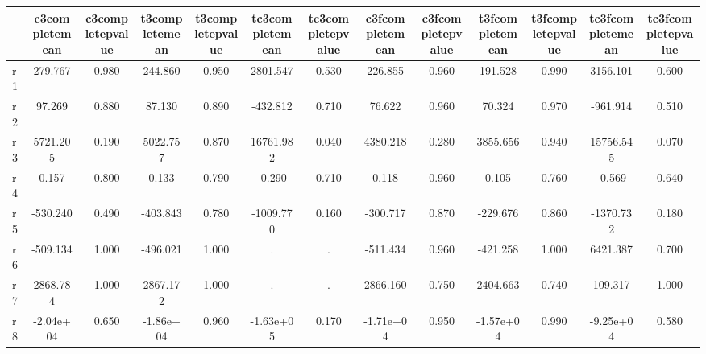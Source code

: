 \begin{table}[htbp]
\begin{tabular}{lcccccccccccc} \hline \hline
 & c3completemean  & c3completepvalue  & t3completemean  & t3completepvalue  & tc3completemean  & tc3completepvalue  & c3fcompletemean  & c3fcompletepvalue  & t3fcompletemean  & t3fcompletepvalue  & tc3fcompletemean  & tc3fcompletepvalue  \\  \hline 
r1 &   279.767 &     0.980 &   244.860 &     0.950 &  2801.547 &     0.530 &   226.855 &     0.960 &   191.528 &     0.990 &  3156.101 &     0.600 \\  
r2 &    97.269 &     0.880 &    87.130 &     0.890 &  -432.812 &     0.710 &    76.622 &     0.960 &    70.324 &     0.970 &  -961.914 &     0.510 \\  
r3 &  5721.205 &     0.190 &  5022.757 &     0.870 & 16761.982 &     0.040 &  4380.218 &     0.280 &  3855.656 &     0.940 & 15756.545 &     0.070 \\  
r4 &     0.157 &     0.800 &     0.133 &     0.790 &    -0.290 &     0.710 &     0.118 &     0.960 &     0.105 &     0.760 &    -0.569 &     0.640 \\  
r5 &  -530.240 &     0.490 &  -403.843 &     0.780 & -1009.770 &     0.160 &  -300.717 &     0.870 &  -229.676 &     0.860 & -1370.732 &     0.180 \\  
r6 &  -509.134 &     1.000 &  -496.021 &     1.000 &         . &         . &  -511.434 &     0.960 &  -421.258 &     1.000 &  6421.387 &     0.700 \\  
r7 &  2868.784 &     1.000 &  2867.172 &     1.000 &         . &         . &  2866.160 &     0.750 &  2404.663 &     0.740 &   109.317 &     1.000 \\  
r8 & -2.04e+04 &     0.650 & -1.86e+04 &     0.960 & -1.63e+05 &     0.170 & -1.71e+04 &     0.950 & -1.57e+04 &     0.990 & -9.25e+04 &     0.580 \\  
\hline \hline \end{tabular}
\end{table}
